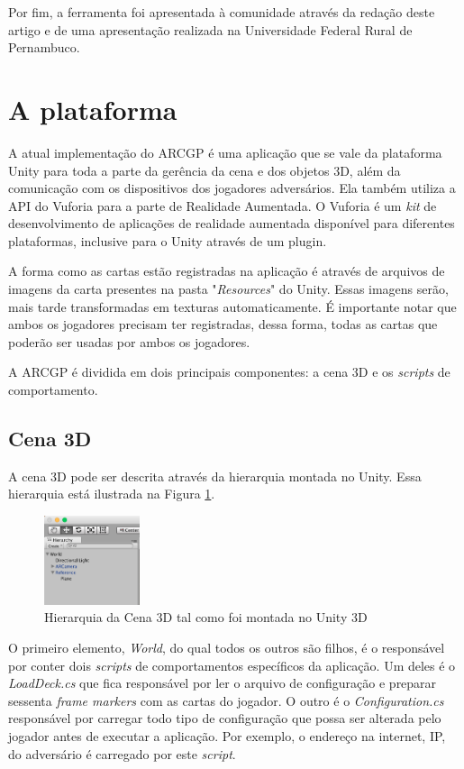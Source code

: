 \documentclass[conference]{IEEEtran}
\begin{document}
Por fim, a ferramenta foi apresentada à comunidade através da redação deste 
artigo e de uma apresentação realizada na Universidade Federal Rural de 
Pernambuco.

\section{A plataforma}
\label{plataforma}
A atual implementação do ARCGP é uma aplicação que se vale da plataforma Unity 
\cite{unity} para toda a parte da gerência da cena e dos objetos 3D, além da 
comunicação com os dispositivos dos jogadores adversários. Ela também utiliza a 
API do Vuforia \cite{vuforia} para a parte de Realidade Aumentada. O Vuforia é 
um \textit{kit} de desenvolvimento de aplicações de realidade aumentada 
disponível para diferentes plataformas, inclusive para o Unity através de  um 
plugin.

A forma como as cartas estão registradas na aplicação é através de arquivos de 
imagens da carta presentes na pasta "\textit{Resources}" do Unity. Essas imagens 
serão, mais tarde transformadas em texturas automaticamente. É importante notar 
que ambos os jogadores precisam ter registradas, dessa forma, todas as cartas 
que poderão ser usadas por ambos os jogadores.

A ARCGP é dividida em dois principais componentes: a cena 3D e os 
\textit{scripts} de comportamento.

\subsection{Cena 3D}
\label{cena3d}
A cena 3D pode ser descrita através da hierarquia montada no Unity. Essa 
hierarquia está ilustrada na Figura \ref{hierarchy}.

\begin{figure}[t]
	\caption{Hierarquia da Cena 3D tal como foi montada no Unity 3D}
	\label{hierarchy}
	\centering
	\includegraphics[width=0.25\textwidth]{hierarchy}
\end{figure}

O primeiro elemento, \textit{World}, do qual todos os outros são filhos, é o 
responsável por conter dois \textit{scripts} de comportamentos específicos da 
aplicação. Um deles é o \textit{LoadDeck.cs} que fica responsável por ler o 
arquivo de configuração e preparar sessenta \textit{frame markers} com as cartas 
do jogador. O outro é o \textit{Configuration.cs} responsável por carregar todo 
tipo de configuração que possa ser alterada pelo jogador antes de executar a 
aplicação. Por exemplo, o endereço na internet, IP, do adversário é carregado 
por este \textit{script}.
\end{document}

